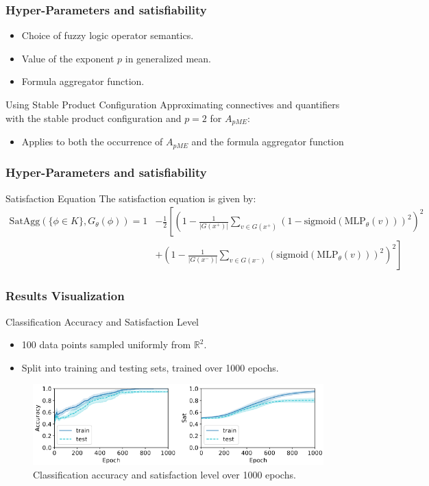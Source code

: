 \documentclass{beamer}
\begin{document}
\begin{frame}
  \frametitle{Hyper-Parameters and satisfiability}
  \begin{itemize}
  \item Choice of fuzzy logic operator semantics.
  \item Value of the exponent \( p \) in generalized mean.
  \item Formula aggregator function.
  \end{itemize}
  \begin{block}{Using Stable Product Configuration}
    Approximating connectives and quantifiers with the stable product
    configuration and \(p = 2\) for $A_{pME}$:
    \begin{itemize}
    \item Applies to both the occurrence of $A_{pME}$ and the formula aggregator function
    \end{itemize}
  \end{block}
\end{frame}
  
\begin{frame}
  \frametitle{Hyper-Parameters and satisfiability}
\begin{block}{Satisfaction Equation}
  The satisfaction equation is given by:
  \tiny
\begin{align*}
\text{SatAgg}(\{\phi \in K\}, G_\theta(\phi)) = 1 &- \frac{1}{2} \left[ \left( 1 - \frac{1}{|G(x^+)|} \sum_{v \in G(x^+)} \left(1 - \text{sigmoid}(\text{MLP}_\theta(v))\right)^2 \right)^2 \right. \\
&+ \left. \left( 1 - \frac{1}{|G(x^-)|} \sum_{v \in G(x^-)} \left(\text{sigmoid}(\text{MLP}_\theta(v))\right)^2 \right)^2 \right]
\end{align*}
\end{block}
\end{frame}

\begin{frame}
\frametitle{Results Visualization}
\begin{block}{Classification Accuracy and Satisfaction Level}
\begin{itemize}
    \item 100 data points sampled uniformly from \( \mathbb{R}^2 \).
    \item Split into training and testing sets, trained over 1000 epochs.
\end{itemize}
\end{block}

\begin{figure}
\includegraphics[width=\textwidth]{ltn1000.png}
\caption{Classification accuracy and satisfaction level over 1000 epochs.}
\end{figure}
\end{frame}
\end{document}
